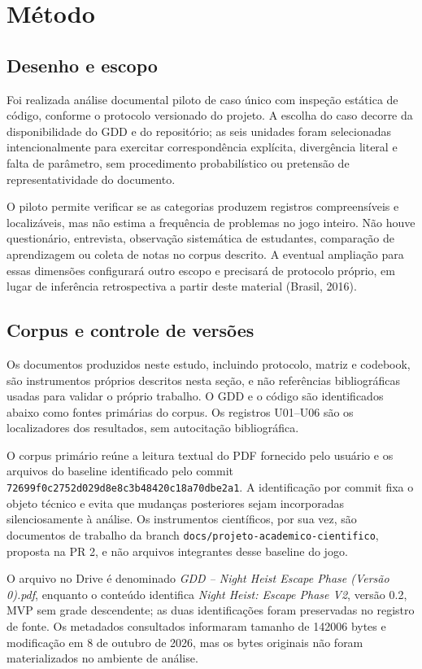 \section{Método}
\subsection{Desenho e escopo}
Foi realizada análise documental piloto de caso único com inspeção estática de código, conforme o protocolo versionado do projeto. A escolha do caso decorre da disponibilidade do GDD e do repositório; as seis unidades foram selecionadas intencionalmente para exercitar correspondência explícita, divergência literal e falta de parâmetro, sem procedimento probabilístico ou pretensão de representatividade do documento.

O piloto permite verificar se as categorias produzem registros compreensíveis e localizáveis, mas não estima a frequência de problemas no jogo inteiro. Não houve questionário, entrevista, observação sistemática de estudantes, comparação de aprendizagem ou coleta de notas no corpus descrito. A eventual ampliação para essas dimensões configurará outro escopo e precisará de protocolo próprio, em lugar de inferência retrospectiva a partir deste material (Brasil, 2016).

\subsection{Corpus e controle de versões}
Os documentos produzidos neste estudo, incluindo protocolo, matriz e codebook, são instrumentos próprios descritos nesta seção, e não referências bibliográficas usadas para validar o próprio trabalho. O GDD e o código são identificados abaixo como fontes primárias do corpus. Os registros U01--U06 são os localizadores dos resultados, sem autocitação bibliográfica.

O corpus primário reúne a leitura textual do PDF fornecido pelo usuário e os arquivos do baseline identificado pelo commit \nolinkurl{72699f0c2752d029d8e8c3b48420c18a70dbe2a1}. A identificação por commit fixa o objeto técnico e evita que mudanças posteriores sejam incorporadas silenciosamente à análise. Os instrumentos científicos, por sua vez, são documentos de trabalho da branch \texttt{docs/projeto-academico-cientifico}, proposta na PR 2, e não arquivos integrantes desse baseline do jogo.

O arquivo no Drive é denominado \emph{GDD -- Night Heist Escape Phase (Versão 0).pdf}, enquanto o conteúdo identifica \emph{Night Heist: Escape Phase V2}, versão 0.2, MVP sem grade descendente; as duas identificações foram preservadas no registro de fonte. Os metadados consultados informaram tamanho de 142006 bytes e modificação em 8 de outubro de 2026, mas os bytes originais não foram materializados no ambiente de análise.

